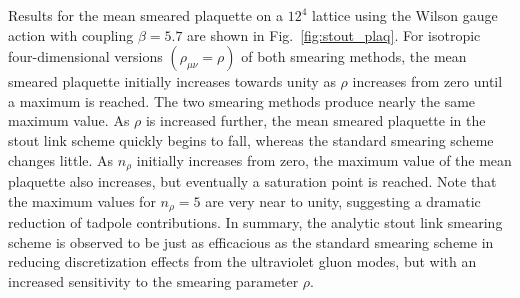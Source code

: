 Results for the mean smeared plaquette on a $12^4$ lattice using the
Wilson gauge action with coupling $\beta=5.7$ are shown in
Fig.~\ref{fig:stout_plaq}.  For isotropic four-dimensional versions
$(\rho_{\mu\nu}=\rho)$ of both smearing methods, the mean
smeared plaquette initially increases towards unity as $\rho$
increases from zero until a maximum is reached.  The two
smearing methods produce nearly the same maximum value.  As $\rho$ is
increased further, the mean smeared plaquette in the stout link scheme
quickly begins to fall, whereas the standard smearing scheme changes
little.  As $n_\rho$ initially increases from zero, the maximum value
of the mean plaquette also increases, but eventually a saturation point
is reached.  Note that the maximum values for $n_\rho=5$ are very near to
unity, suggesting a dramatic reduction of tadpole contributions. 
In summary, the analytic stout link smearing scheme is observed to be just
as efficacious as the standard smearing scheme in reducing discretization
effects from the ultraviolet gluon modes, but with an increased sensitivity
to the smearing parameter $\rho$.

